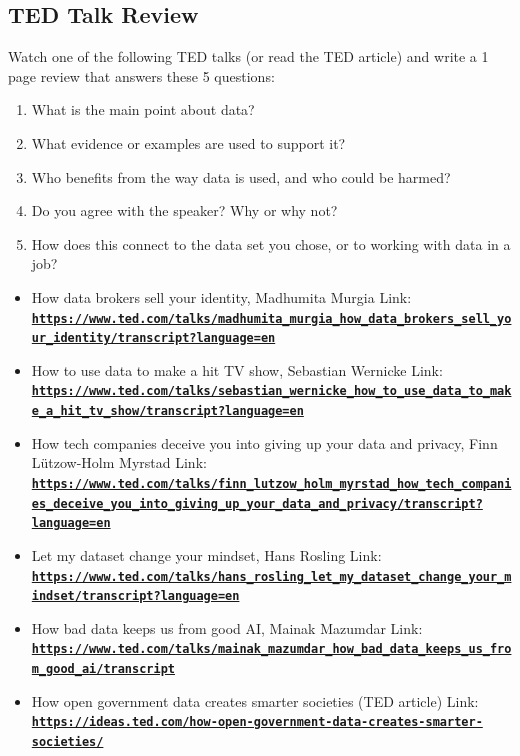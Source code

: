 \documentclass[12pt]{article}
\begin{document}
\subsection*{TED Talk Review}
Watch one of the following TED talks (or read the TED article) and write a 1 page review that answers these 5 questions:
\begin{enumerate}
    \item What is the main point about data?
    \item What evidence or examples are used to support it?
    \item Who benefits from the way data is used, and who could be harmed?
    \item Do you agree with the speaker? Why or why not?
    \item How does this connect to the data set you chose, or to working with data in a job?
\end{enumerate}
\begin{itemize}
    \item How data brokers sell your identity, Madhumita Murgia Link: \href{https://www.ted.com/talks/madhumita_murgia_how_data_brokers_sell_your_identity/transcript?language=en}{\textbf{\nolinkurl{https://www.ted.com/talks/madhumita_murgia_how_data_brokers_sell_your_identity/transcript?language=en}}}
    \item How to use data to make a hit TV show, Sebastian Wernicke Link: \href{https://www.ted.com/talks/sebastian_wernicke_how_to_use_data_to_make_a_hit_tv_show/transcript?language=en}{\textbf{\nolinkurl{https://www.ted.com/talks/sebastian_wernicke_how_to_use_data_to_make_a_hit_tv_show/transcript?language=en}}}
    \item How tech companies deceive you into giving up your data and privacy, Finn Lützow-Holm Myrstad Link: \href{https://www.ted.com/talks/finn_lutzow_holm_myrstad_how_tech_companies_deceive_you_into_giving_up_your_data_and_privacy/transcript?language=en}{\textbf{\nolinkurl{https://www.ted.com/talks/finn_lutzow_holm_myrstad_how_tech_companies_deceive_you_into_giving_up_your_data_and_privacy/transcript?language=en}}}
    \item Let my dataset change your mindset, Hans Rosling Link: \href{https://www.ted.com/talks/hans_rosling_let_my_dataset_change_your_mindset/transcript?language=en}{\textbf{\nolinkurl{https://www.ted.com/talks/hans_rosling_let_my_dataset_change_your_mindset/transcript?language=en}}}
    \item How bad data keeps us from good AI, Mainak Mazumdar Link: \href{https://www.ted.com/talks/mainak_mazumdar_how_bad_data_keeps_us_from_good_ai/transcript}{\textbf{\nolinkurl{https://www.ted.com/talks/mainak_mazumdar_how_bad_data_keeps_us_from_good_ai/transcript}}}
    \item How open government data creates smarter societies (TED article) Link: \href{https://ideas.ted.com/how-open-government-data-creates-smarter-societies/}{\textbf{\nolinkurl{https://ideas.ted.com/how-open-government-data-creates-smarter-societies/}}}
\end{itemize}
\end{document}
